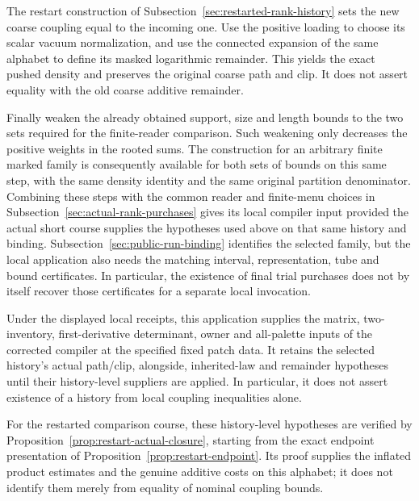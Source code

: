 The restart construction of Subsection~\ref{sec:restarted-rank-history}
sets the new coarse coupling equal to the incoming one. Use the positive
loading to choose its scalar vacuum normalization, and use the connected
expansion of the same alphabet to define its masked logarithmic
remainder. This yields the exact pushed density and preserves the
original coarse path and clip. It does not assert equality with the old
coarse additive remainder.

Finally weaken the already obtained support, size and length bounds to
the two sets required for the finite-reader comparison. Such weakening
only decreases the positive weights in the rooted sums. The construction
for an arbitrary finite marked family is consequently available for
both sets of bounds on this same step, with the same density identity
and the same original partition denominator. Combining these steps with
the common reader and finite-menu choices in
Subsection~\ref{sec:actual-rank-purchases} gives its local compiler input
provided the actual short course supplies the hypotheses used above on
that same history and binding. Subsection~\ref{sec:public-run-binding}
identifies the selected family, but the local application also needs
the matching interval, representation, tube and bound certificates.
In particular, the existence of final trial purchases does not by itself
recover those certificates for a separate local invocation.

Under the displayed local receipts, this application supplies the matrix,
two-inventory, first-derivative determinant, owner and all-palette inputs
of the corrected compiler at the specified fixed patch data. It retains
the selected history's actual path/clip, alongside, inherited-law and
remainder hypotheses until their history-level suppliers are applied.
In particular, it does not assert existence of a history from local
coupling inequalities alone.

For the restarted comparison course, these history-level hypotheses are
verified by Proposition~\ref{prop:restart-actual-closure}, starting from
the exact endpoint presentation of Proposition~\ref{prop:restart-endpoint}.
Its proof supplies the inflated product estimates and the genuine additive
costs on this alphabet; it does not identify them merely from equality of
nominal coupling bounds.
